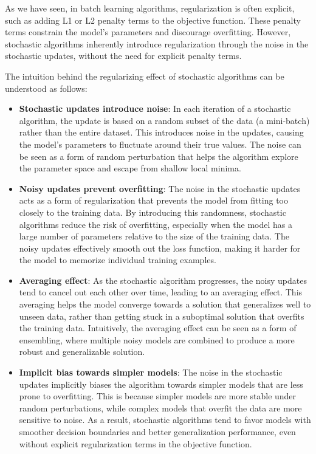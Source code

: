 As we have seen, in batch learning algorithms, regularization is often explicit, such as adding L1 or L2 penalty terms to the objective function. These penalty terms constrain the model's parameters and discourage overfitting. However, stochastic algorithms inherently introduce regularization through the noise in the stochastic updates, without the need for explicit penalty terms.

The intuition behind the regularizing effect of stochastic algorithms can be understood as follows:

\begin{itemize}
    \item \textbf{Stochastic updates introduce noise}: In each iteration of a stochastic algorithm, the update is based on a random subset of the data (a mini-batch) rather than the entire dataset. This introduces noise in the updates, causing the model's parameters to fluctuate around their true values. The noise can be seen as a form of random perturbation that helps the algorithm explore the parameter space and escape from shallow local minima.
    \item \textbf{Noisy updates prevent overfitting}: The noise in the stochastic updates acts as a form of regularization that prevents the model from fitting too closely to the training data. By introducing this randomness, stochastic algorithms reduce the risk of overfitting, especially when the model has a large number of parameters relative to the size of the training data. The noisy updates effectively smooth out the loss function, making it harder for the model to memorize individual training examples.

    \item \textbf{Averaging effect}: As the stochastic algorithm progresses, the noisy updates tend to cancel out each other over time, leading to an averaging effect. This averaging helps the model converge towards a solution that generalizes well to unseen data, rather than getting stuck in a suboptimal solution that overfits the training data. Intuitively, the averaging effect can be seen as a form of ensembling, where multiple noisy models are combined to produce a more robust and generalizable solution.
    
    \item \textbf{Implicit bias towards simpler models}: The noise in the stochastic updates implicitly biases the algorithm towards simpler models that are less prone to overfitting. This is because simpler models are more stable under random perturbations, while complex models that overfit the data are more sensitive to noise. As a result, stochastic algorithms tend to favor models with smoother decision boundaries and better generalization performance, even without explicit regularization terms in the objective function.
\end{itemize}

